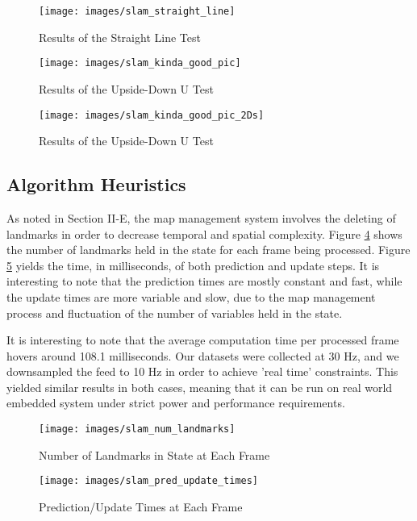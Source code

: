 \documentclass[conference]{IEEEtran}
\begin{document}
\begin{figure}[h]
\centering
\texttt{[image: images/slam\_straight\_line]}
\caption{Results of the Straight Line Test}
\label{fig:straight_line_test}
\end{figure}

\begin{figure}[h]
\centering
\texttt{[image: images/slam\_kinda\_good\_pic]}
\caption{Results of the Upside-Down U Test}
\label{fig:U_test_3D}
\end{figure}

\begin{figure}[h]
\centering
\texttt{[image: images/slam\_kinda\_good\_pic\_2Ds]}
\caption{Results of the Upside-Down U Test}
\label{fig:U_test_2D}
\end{figure}


\subsection{Algorithm Heuristics}
As noted in Section II-E, the map management system involves the deleting of landmarks in order to decrease temporal and spatial complexity. Figure \ref{fig:num_landmarks} shows the number of landmarks held in the state for each frame being processed. Figure \ref{fig:pred_update_times} yields the time, in milliseconds, of both prediction and update steps. It is interesting to note that the prediction times are mostly constant and fast, while the update times are more variable and slow, due to the map management process and fluctuation of the number of variables held in the state. 

It is interesting to note that the average computation time per processed frame hovers around 108.1 milliseconds. Our datasets were collected at 30 Hz, and we downsampled the feed to 10 Hz in order to achieve 'real time' constraints. This yielded similar results in both cases, meaning that it can be run on real world embedded system under strict power and performance requirements.


\begin{figure}[h]
\centering
\texttt{[image: images/slam\_num\_landmarks]}
\caption{Number of Landmarks in State at Each Frame}
\label{fig:num_landmarks}
\end{figure}

\begin{figure}[h]
\centering
\texttt{[image: images/slam\_pred\_update\_times]}
\caption{Prediction/Update Times at Each Frame}
\label{fig:pred_update_times}
\end{figure}
\end{document}

